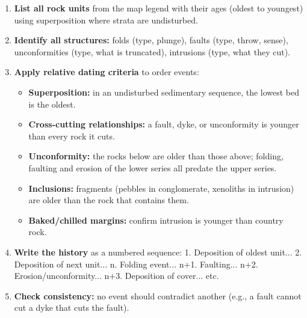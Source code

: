 \documentclass[11pt]{article}
\begin{document}
\begin{methode}
\begin{enumerate}
\item \textbf{List all rock units} from the map legend with their ages (oldest to youngest) using superposition where strata are undisturbed.
\item \textbf{Identify all structures:} folds (type, plunge), faults (type, throw, sense), unconformities (type, what is truncated), intrusions (type, what they cut).
\item \textbf{Apply relative dating criteria} to order events:
  \begin{itemize}
  \item \textbf{Superposition:} in an undisturbed sedimentary sequence, the lowest bed is the oldest.
  \item \textbf{Cross-cutting relationships:} a fault, dyke, or unconformity is younger than every rock it cuts.
  \item \textbf{Unconformity:} the rocks below are older than those above; folding, faulting and erosion of the lower series all predate the upper series.
  \item \textbf{Inclusions:} fragments (pebbles in conglomerate, xenoliths in intrusion) are older than the rock that contains them.
  \item \textbf{Baked/chilled margins:} confirm intrusion is younger than country rock.
  \end{itemize}
\item \textbf{Write the history} as a numbered sequence: 1. Deposition of oldest unit... 2. Deposition of next unit... n. Folding event... n+1. Faulting... n+2. Erosion/unconformity... n+3. Deposition of cover... etc.
\item \textbf{Check consistency:} no event should contradict another (e.g., a fault cannot cut a dyke that cuts the fault).
\end{enumerate}
\end{methode}
\end{document}
